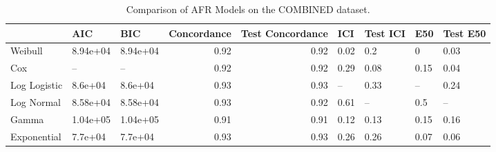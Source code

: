 \begin{table*}
\centering
\caption{Comparison of AFR Models on the COMBINED dataset.}
\label{tab:combined}
\begin{tabular}{lllrrllll}
\toprule
 & AIC & BIC & Concordance & Test Concordance & ICI & Test ICI & E50 & Test E50 \\
\midrule
Weibull & 8.94e+04 & 8.94e+04 & 0.92 & 0.92 & 0.02 & 0.2 & 0 & 0.03 \\
Cox & -- & -- & 0.92 & 0.92 & 0.29 & 0.08 & 0.15 & 0.04 \\
Log Logistic & 8.6e+04 & 8.6e+04 & 0.93 & 0.93 & -- & 0.33 & -- & 0.24 \\
Log Normal & 8.58e+04 & 8.58e+04 & 0.93 & 0.92 & 0.61 & -- & 0.5 & -- \\
Gamma & 1.04e+05 & 1.04e+05 & 0.91 & 0.91 & 0.12 & 0.13 & 0.15 & 0.16 \\
Exponential & 7.7e+04 & 7.7e+04 & 0.93 & 0.93 & 0.26 & 0.26 & 0.07 & 0.06 \\
\bottomrule
\end{tabular}
\end{table*}
